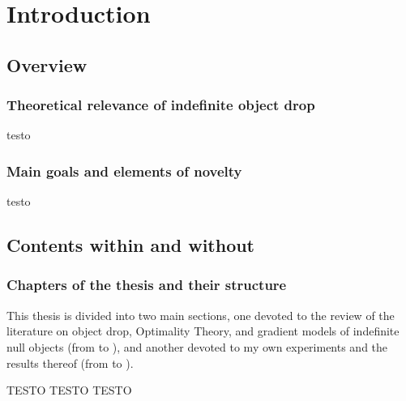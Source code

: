 \setchapterpreamble[u]{\margintoc}
\chapter{Introduction}

\section{Overview} 

\subsection{Theoretical relevance of indefinite object drop}
testo 

\subsection{Main goals and elements of novelty}
testo


\section{Contents within and without} 

\subsection{Chapters of the thesis and their structure}
This thesis is divided into two main sections, one devoted to the review of the literature on object drop, Optimality Theory, and gradient models of indefinite null objects (from  to ), and another devoted to my own experiments and the results thereof (from  to ).

TESTO TESTO TESTO

